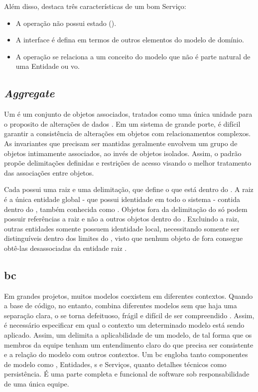 Além disso,  destaca três características de um bom Serviço:
\begin{itemize}
    \item A operação não possui estado ().
    \item A interface é defina em termos de outros elementos do modelo de domínio.
    \item A operação se relaciona a um conceito do modelo que não é parte natural de uma Entidade ou \acrshort{vo}.
\end{itemize}

\subsection{\textit{Aggregate}}
\label{section:aggregate}
Um  é um conjunto de objetos associados, tratados como uma única unidade para o proposito de alterações de dados \cite{evans2004ddd}. Em um sistema de grande porte, é difícil garantir a consistência de alterações em objetos com relacionamentos complexos. As invariantes que precisam ser mantidas geralmente envolvem um grupo de objetos intimamente associados, ao invés de objetos isolados. Assim, o padrão  propõe delimitações definidas e restrições de acesso visando o melhor tratamento das associações entre objetos.

Cada  possui uma raiz e uma delimitação, que define o que está dentro do  \cite{evans2004ddd}. A raiz é a única entidade global - que possui identidade em todo o sistema - contida dentro do , também conhecida como  \cite{evans2004ddd}. Objetos fora da delimitação do  só podem possuir referências a raiz e não a outros objetos dentro do . Excluindo a raiz, outras entidades somente possuem identidade local, necessitando somente ser distinguíveis dentro dos limites do , visto que nenhum objeto de fora consegue obtê-las desassociadas da entidade raiz \cite{evans2004ddd}.

\subsection{\acrfull{bc}}
\label{section:bounded_context}
Em grandes projetos, muitos modelos coexistem em diferentes contextos. Quando a base de código, no entanto, combina diferentes modelos sem que haja uma separação clara, o  se torna defeituoso, frágil e difícil de ser compreendido \cite{evans2004ddd}. Assim, é necessário especificar em qual o contexto um determinado modelo está sendo aplicado.  Assim, um  delimita a aplicabilidade de um modelo, de tal forma que os membros da equipe tenham um entendimento claro do que precisa ser consistente e a relação do modelo com outros contextos. Um \acrshort{bc} engloba tanto componentes de modelo como , Entidades, s e Serviços, quanto detalhes técnicos como persistência. É uma parte completa e funcional de software sob responsabilidade de uma única equipe.

